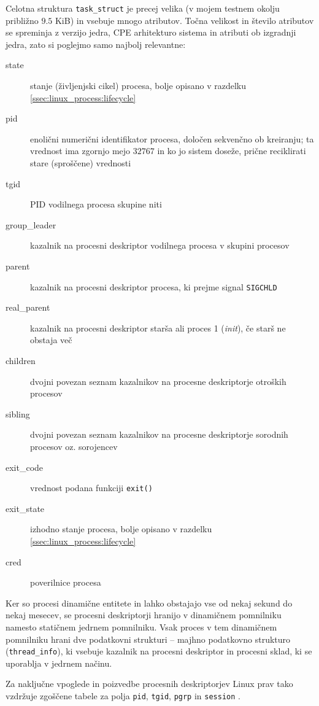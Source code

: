 \documentclass[a4paper,12pt,openright]{book}
\begin{document}
Celotna struktura \texttt{task\_struct} je precej velika (v mojem testnem okolju približno $9.5$ KiB) in vsebuje mnogo atributov.
Točna velikost in število atributov se spreminja z verzijo jedra, CPE arhitekturo sistema in atributi ob izgradnji jedra, zato si poglejmo samo najbolj relevantne:
\begin{description}
	\item[state] stanje (življenjski cikel) procesa, bolje opisano v razdelku \ref{ssec:linux_process:lifecycle}
	\item[pid] enolični numerični identifikator procesa, določen sekvenčno ob kreiranju; ta vrednost ima zgornjo mejo $32767$ in ko jo sistem doseže, prične reciklirati stare (sproščene) vrednosti
	\item[tgid] PID vodilnega procesa skupine niti
	\item[group\_leader] kazalnik na procesni deskriptor vodilnega procesa v skupini procesov
	\item[parent] kazalnik na procesni deskriptor procesa, ki prejme signal \texttt{SIGCHLD}
	\item[real\_parent] kazalnik na procesni deskriptor starša ali proces 1 (\textit{init}), če starš ne obstaja več
	\item[children] dvojni povezan seznam kazalnikov na procesne deskriptorje otroških procesov
	\item[sibling] dvojni povezan seznam kazalnikov na procesne deskriptorje sorodnih procesov oz. sorojencev
	\item[exit\_code] vrednost podana funkciji \texttt{exit()}
	\item[exit\_state] izhodno stanje procesa, bolje opisano v razdelku \ref{ssec:linux_process:lifecycle}
	\item[cred] poverilnice procesa
\end{description}

Ker so procesi dinamične entitete in lahko obstajajo vse od nekaj sekund do nekaj mesecev, se procesni deskriptorji hranijo v dinamičnem pomnilniku namesto statičnem jedrnem pomnilniku.
Vsak proces v tem dinamičnem pomnilniku hrani dve podatkovni strukturi -- majhno podatkovno strukturo (\texttt{thread\_info}), ki vsebuje kazalnik na procesni deskriptor in procesni sklad, ki se uporablja v jedrnem načinu.

Za naključne vpoglede in poizvedbe procesnih deskriptorjev Linux prav tako vzdržuje zgoščene tabele za polja \texttt{pid}, \texttt{tgid}, \texttt{pgrp} in \texttt{session} \cite{Bovet_Cesati_2005}.
\end{document}
